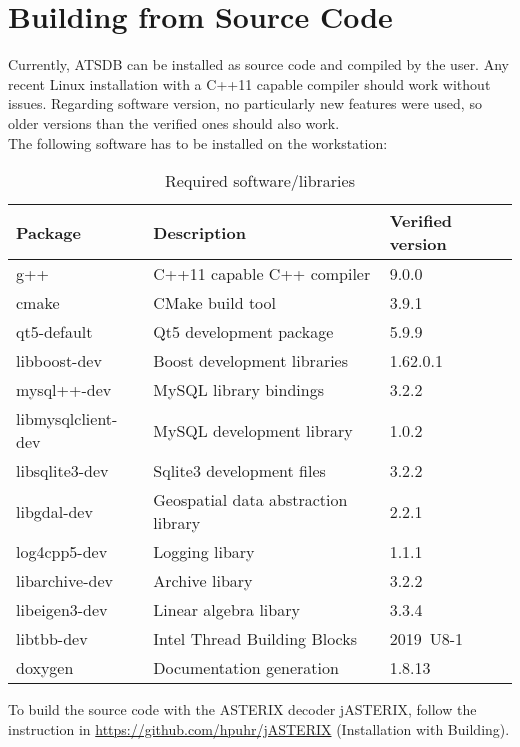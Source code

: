 \section{Building from Source Code}
Currently, ATSDB can be installed as source code and compiled by the user. Any recent Linux installation with a C++11 capable compiler should work without issues. Regarding software version, no particularly new features were used, so older versions than the verified ones should also work. \\

The following software has to be installed on the workstation:

\begin{table}[H]
  \center
  \begin{tabular}{ | l | l | l |}
    \hline
    \textbf{Package} & \textbf{Description} & \textbf{Verified version} \\ \hline
    g++ & C++11 capable C++ compiler & 9.0.0 \\ \hline
    cmake & CMake build tool & 3.9.1 \\ \hline
    qt5-default & Qt5 development package & 5.9.9 \\ \hline
    libboost-dev & Boost development libraries & 1.62.0.1 \\ \hline
    mysql++-dev & MySQL library bindings & 3.2.2 \\ \hline
    libmysqlclient-dev & MySQL development library & 1.0.2 \\ \hline
    libsqlite3-dev & Sqlite3 development files & 3.2.2 \\ \hline
    libgdal-dev & Geospatial data abstraction library & 2.2.1 \\ \hline
    log4cpp5-dev & Logging libary & 1.1.1 \\ \hline
    libarchive-dev & Archive libary & 3.2.2 \\ \hline
    libeigen3-dev & Linear algebra libary & 3.3.4 \\ \hline
    libtbb-dev & Intel Thread Building Blocks & 2019~U8-1 \\ \hline
    doxygen & Documentation generation & 1.8.13 \\ 
    \hline
  \end{tabular}
  \caption{Required software/libraries}
\end{table}

To build the source code with the ASTERIX decoder jASTERIX, follow the instruction in \url{https://github.com/hpuhr/jASTERIX} (Installation with Building). \\

